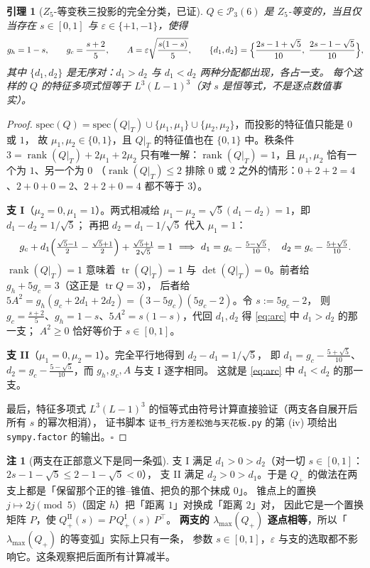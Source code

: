 \documentclass[UTF8,11pt]{ctexart}
\newtheorem{lemma}[theorem]{引理}
\theoremstyle{definition}
\newtheorem{remark}[theorem]{注}
\newcommand{\tr}{\operatorname{tr}}
\newcommand{\rank}{\operatorname{rank}}
\begin{document}
\begin{lemma}[$Z_5$-等变秩三投影的完全分类，已证]\label{lem:z5class}
$Q\in\mathcal P_3(6)$ 是 $Z_5$-等变的，当且仅当存在 $s\in[0,1]$ 与 $\varepsilon\in\{+1,-1\}$，使得
\begin{equation}\label{eq:arc}
g_h=1-s,\qquad g_c=\frac{s+2}5,\qquad A=\varepsilon\sqrt{\frac{s(1-s)}5},\qquad
\{d_1,d_2\}=\Bigl\{\frac{2s-1+\sqrt5}{10},\ \frac{2s-1-\sqrt5}{10}\Bigr\},
\end{equation}
其中 $\{d_1,d_2\}$ 是\emph{无序}对：$d_1>d_2$ 与 $d_1<d_2$ 两种分配都出现，各占一支。
每个这样的 $Q$ 的特征多项式恒等于 $L^3(L-1)^3$（对 $s$ 是恒等式，不是逐点数值事实）。
\end{lemma}

\begin{proof}
$\mathrm{spec}(Q)=\mathrm{spec}(Q|_T)\cup\{\mu_1,\mu_1\}\cup\{\mu_2,\mu_2\}$，而投影的特征值只能是 $0$ 或 $1$，
故 $\mu_1,\mu_2\in\{0,1\}$，且 $Q|_T$ 的特征值也在 $\{0,1\}$ 中。秩条件
$3=\rank(Q|_T)+2\mu_1+2\mu_2$ 只有唯一解：$\rank(Q|_T)=1$，且 $\mu_1,\mu_2$ 恰有一个为 $1$、另一个为 $0$
（$\rank(Q|_T)\le2$ 排除 $0$ 或 $2$ 之外的情形：$0+2+2=4$、$2+0+0=2$、$2+2+0=4$ 都不等于 $3$）。

\textbf{支 I}（$\mu_2=0,\mu_1=1$）。两式相减给 $\mu_1-\mu_2=\sqrt5(d_1-d_2)=1$，即 $d_1-d_2=1/\sqrt5$；
再把 $d_2=d_1-1/\sqrt5$ 代入 $\mu_1=1$：
\[
g_c+d_1\Bigl(\tfrac{\sqrt5-1}2-\tfrac{\sqrt5+1}2\Bigr)+\tfrac{\sqrt5+1}{2\sqrt5}=1
\ \Longrightarrow\ d_1=g_c-\tfrac{5-\sqrt5}{10},\quad d_2=g_c-\tfrac{5+\sqrt5}{10}.
\]
$\rank(Q|_T)=1$ 意味着 $\tr(Q|_T)=1$ 与 $\det(Q|_T)=0$。前者给 $g_h+5g_c=3$（这正是 $\tr Q=3$），
后者给 $5A^2=g_h(g_c+2d_1+2d_2)=(3-5g_c)(5g_c-2)$。令 $s:=5g_c-2$，
则 $g_c=\frac{s+2}5$、$g_h=1-s$、$5A^2=s(1-s)$，代回 $d_1,d_2$ 得 \eqref{eq:arc} 中 $d_1>d_2$ 的那一支；
$A^2\ge0$ 恰好等价于 $s\in[0,1]$。

\textbf{支 II}（$\mu_1=0,\mu_2=1$）。完全平行地得到 $d_2-d_1=1/\sqrt5$，
即 $d_1=g_c-\frac{5+\sqrt5}{10}$、$d_2=g_c-\frac{5-\sqrt5}{10}$，而 $g_h,g_c,A$ 与支 I 逐字相同。
这就是 \eqref{eq:arc} 中 $d_1<d_2$ 的那一支。

最后，特征多项式 $L^3(L-1)^3$ 的恒等式由符号计算直接验证（两支各自展开后所有 $s$ 的幂次相消），
证书脚本 \texttt{证书\_行方差松弛与天花板.py} 的第 (iv) 项给出 \texttt{sympy.factor} 的输出。$\square$
\end{proof}

\begin{remark}[两支在正部意义下是同一条弧]\label{rmk:twobranch}
支 I 满足 $d_1>0>d_2$（对一切 $s\in[0,1]$：$2s-1-\sqrt5\le2-1-\sqrt5<0$），
支 II 满足 $d_2>0>d_1$。于是 $Q_+$ 的做法在两支上都是「保留那个正的锥--锥值、把负的那个抹成 $0$」。
锥点上的置换 $j\mapsto 2j\pmod 5$（固定 $h$）把「距离 $1$」对换成「距离 $2$」对，
因此它是一个置换矩阵 $P$，使 $Q_+^{\mathrm{II}}(s)=P\,Q_+^{\mathrm{I}}(s)\,P^\top$。
\textbf{两支的 $\lambda_{\max}(Q_+)$ 逐点相等}，所以「$\lambda_{\max}(Q_+)$ 的等变弧」实际上只有一条，
参数 $s\in[0,1]$，$\varepsilon$ 与支的选取都不影响它。这条观察把后面所有计算减半。
\end{remark}
\end{document}
